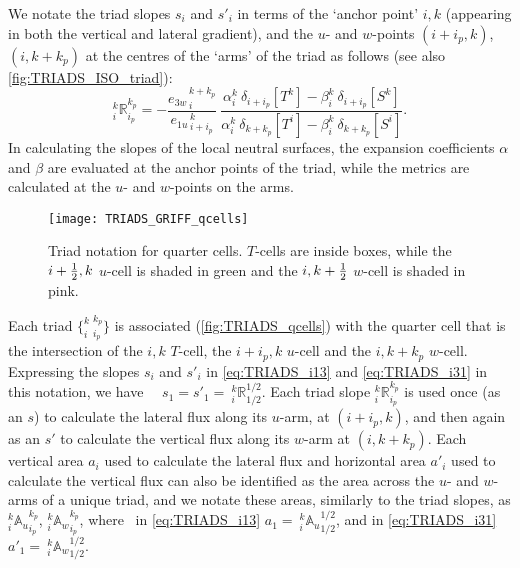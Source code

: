 \documentclass[../main/NEMO_manual]{subfiles}
\begin{document}
We notate the triad slopes $s_i$ and $s'_i$ in terms of the `anchor point' $i,k$
(appearing in both the vertical and lateral gradient),
and the $u$- and $w$-points $(i+i_p,k)$, $(i,k+k_p)$ at the centres of the `arms' of the triad as follows
(see also \autoref{fig:TRIADS_ISO_triad}):
\begin{equation}
  \label{eq:TRIADS_R}
  _i^k \mathbb{R}_{i_p}^{k_p}
  =-\frac{ {e_{3w}}_{\,i}^{\,k+k_p}} { {e_{1u}}_{\,i+i_p}^{\,k}}
  \
  \frac
  { \alpha_i^k  \ \delta_{i+i_p}[T^k] - \beta_i^k \ \delta_{i+i_p}[S^k] }
  { \alpha_i^k  \ \delta_{k+k_p}[T^i] - \beta_i^k \ \delta_{k+k_p}[S^i] }.
\end{equation}
In calculating the slopes of the local neutral surfaces,
the expansion coefficients $\alpha$ and $\beta$ are evaluated at the anchor points of the triad,
while the metrics are calculated at the $u$- and $w$-points on the arms.

\begin{figure}[tb]
  \centering
  \texttt{[image: TRIADS\_GRIFF\_qcells]}
  \caption[Triad notation for quarter cells]{
    Triad notation for quarter cells.
    $T$-cells are inside boxes,
    while the $i+\textstyle \frac{1}{2},k$ $u$-cell is shaded in green and
    the $i,k+\textstyle \frac{1}{2}$ $w$-cell is shaded in pink.}
  \label{fig:TRIADS_qcells}
\end{figure}

Each triad $\{_i^{k}\:_{i_p}^{k_p}\}$ is associated (\autoref{fig:TRIADS_qcells}) with the quarter cell that is
the intersection of the $i,k$ $T$-cell, the $i+i_p,k$ $u$-cell and the $i,k+k_p$ $w$-cell.
Expressing the slopes $s_i$ and $s'_i$ in \autoref{eq:TRIADS_i13} and \autoref{eq:TRIADS_i31} in this notation,
we have \eg\ \ $s_1=s'_1={\:}_i^k \mathbb{R}_{1/2}^{1/2}$.
Each triad slope $_i^k\mathbb{R}_{i_p}^{k_p}$ is used once (as an $s$) to
calculate the lateral flux along its $u$-arm, at $(i+i_p,k)$,
and then again as an $s'$ to calculate the vertical flux along its $w$-arm at $(i,k+k_p)$.
Each vertical area $a_i$ used to calculate the lateral flux and horizontal area $a'_i$ used to
calculate the vertical flux can also be identified as the area across the $u$- and $w$-arms of a unique triad,
and we notate these areas, similarly to the triad slopes,
as $_i^k{\mathbb{A}_u}_{i_p}^{k_p}$, $_i^k{\mathbb{A}_w}_{i_p}^{k_p}$,
where \eg\ in \autoref{eq:TRIADS_i13} $a_{1}={\:}_i^k{\mathbb{A}_u}_{1/2}^{1/2}$,
and in \autoref{eq:TRIADS_i31} $a'_{1}={\:}_i^k{\mathbb{A}_w}_{1/2}^{1/2}$.

\end{document}
